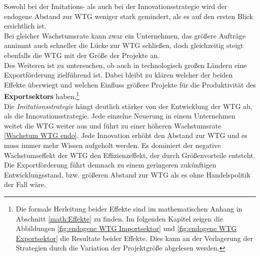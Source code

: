 Sowohl bei der Imitations- als auch bei der Innovationsstrategie wird der endogene Abstand zur WTG weniger stark gemindert, als es auf den ersten Blick ersichtlich ist.\\


Bei gleicher Wachstumsrate kann zwar ein Unternehmen, das größere Aufträge annimmt auch schneller die Lücke zur WTG schließen, doch gleichzeitig steigt ebenfalls die WTG mit der Größe der Projekte an.\\


Des Weiteren ist zu untersuchen, ob auch in technologisch großen Ländern eine Exportförderung zielführend ist. Dabei bleibt zu klären welcher der beiden Effekte überwiegt und welchen Einfluss größere Projekte für die Produktivität des \textbf{Exportsektors} haben.\footnote{Die formale Herleitung beider Effekte sind im mathematischen Anhang in Abschnitt \ref{math:Effekte} zu finden. Im folgenden Kapitel zeigen die Abbildungen \ref{fig:endogene WTG Importsektor} und \ref{fig:endogene WTG Exportsektor} die Resultate beider Effekte. Dies kann an der Verlagerung der Strategien durch die Variation der Projektgröße abgelesen werden.}\\


Die \textit{Imitationsstrategie} hängt deutlich stärker von der Entwicklung der WTG ab, als die Innovationsstrategie. Jede einzelne Neuerung in einem Unternehmen weitet die WTG weiter aus und führt zu einer höheren Wachstumsrate \eqref{Wachstum WTG endo}. Jede Innovation erhöht den Abstand zur WTG und es muss immer mehr Wissen aufgeholt werden. Es dominiert der negative Wachstumseffekt der WTG den Effizienzeffekt, der durch Größenvorteile entsteht. Die Exportförderung führt demnach zu einem geringeren zukünftigen Entwicklungsstand, bzw. größeren Abstand zur WTG als es ohne Handelspolitik der Fall wäre.\\


